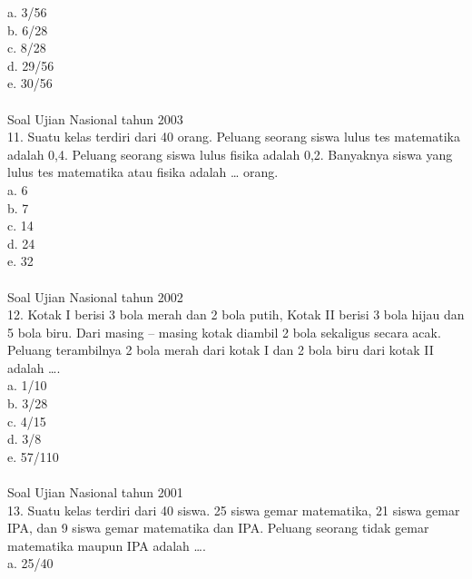 \documentclass[11pt,fleqn]{book} %
\begin{document}
a. 3/56\\

b. 6/28\\

c. 8/28\\

d. 29/56\\

e. 30/56\\
\\

Soal Ujian Nasional tahun 2003\\
11. Suatu kelas terdiri dari 40 orang. Peluang seorang siswa lulus tes matematika adalah 0,4. Peluang seorang siswa lulus fisika adalah 0,2. Banyaknya siswa yang lulus tes matematika atau fisika adalah … orang.\\

a. 6\\

b. 7\\

c. 14\\

d. 24\\

e. 32\\
\\

Soal Ujian Nasional tahun 2002\\
12. Kotak I berisi 3 bola merah dan 2 bola putih, Kotak II berisi 3 bola hijau dan 5 bola biru. Dari masing – masing kotak diambil 2 bola sekaligus secara acak. Peluang terambilnya 2 bola merah dari kotak I dan 2 bola biru dari kotak II adalah ….\\

a. 1/10\\

b. 3/28\\

c. 4/15\\

d. 3/8\\

e. 57/110\\
\\

Soal Ujian Nasional tahun 2001\\
13. Suatu kelas terdiri dari 40 siswa. 25 siswa gemar matematika, 21 siswa gemar IPA, dan 9 siswa gemar matematika dan IPA. Peluang seorang tidak gemar matematika maupun IPA adalah ….\\

a. 25/40\\
\end{document}
